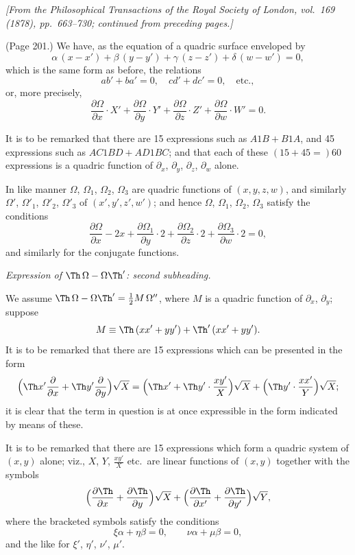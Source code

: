 \documentclass[11pt,a4paper]{book}
\begin{document}
\noindent\textit{[From the \emph{Philosophical Transactions of the Royal Society of London}, vol.~169 (1878), pp.~663--730; continued from preceding pages.]}

\medskip

\noindent (Page 201.) We have, as the equation of a quadric surface enveloped by
\[
\alpha\,(x - x') + \beta\,(y - y') + \gamma\,(z - z') + \delta\,(w - w') = 0,
\]
which is the same form as before, the relations
\[
ab' + ba' = 0, \quad cd' + dc' = 0, \quad \text{etc.},
\]
or, more precisely,
\[
\frac{\partial\Omega}{\partial x} \cdot X' + \frac{\partial\Omega}{\partial y} \cdot Y' + \frac{\partial\Omega}{\partial z} \cdot Z' + \frac{\partial\Omega}{\partial w} \cdot W' = 0.
\]

It is to be remarked that there are 15 expressions such as $A1B + B1A$, and 45 expressions such as $AC1BD + AD1BC$; and that each of these $(15 + 45 = ) 60$ expressions is a quadric function of $\partial_x$, $\partial_y$, $\partial_z$, $\partial_w$ alone.

In like manner $\Omega$, $\Omega_1$, $\Omega_2$, $\Omega_3$ are quadric functions of $(x, y, z, w)$, and similarly $\Omega'$, $\Omega'_1$, $\Omega'_2$, $\Omega'_3$ of $(x', y', z', w')$; and hence $\Omega$, $\Omega_1$, $\Omega_2$, $\Omega_3$ satisfy the conditions
\[
\frac{\partial\Omega}{\partial x} - 2x + \frac{\partial\Omega_1}{\partial y} \cdot 2 + \frac{\partial\Omega_2}{\partial z} \cdot 2 + \frac{\partial\Omega_3}{\partial w} \cdot 2 = 0,
\]
and similarly for the conjugate functions.

\medskip

\noindent \textit{Expression of $\Th\,\Omega - \Omega\Th'$: second subheading.}

We assume $\Th\,\Omega - \Omega\Th' = \tfrac{1}{2}M\,\Omega''$, where $M$ is a quadric function of $\partial_x$, $\partial_y$; suppose
\[
M \equiv \Th\,(x x' + y y') + \Th'\,(x x' + y y').
\]
It is to be remarked that there are 15 expressions which can be presented in the form
\[
\Big(\Th x' \frac{\partial}{\partial x} + \Th y' \frac{\partial}{\partial y}\Big) \sqrt{X} = \Big( \Th x' + \Th y' \cdot \frac{x y'}{X} \Big) \sqrt{X} + \Big(\Th y' \cdot \frac{x x'}{Y}\Big) \sqrt{X};
\]
it is clear that the term in question is at once expressible in the form indicated by means of these.

It is to be remarked that there are 15 expressions which form a quadric system of $(x, y)$ alone; viz., $X$, $Y$, $\frac{x y'}{X}$ etc.\ are linear functions of $(x, y)$ together with the symbols
\[
\Big(\frac{\partial\Th}{\partial x} + \frac{\partial\Th}{\partial y}\Big) \sqrt{X} + \Big(\frac{\partial\Th}{\partial x'} + \frac{\partial\Th}{\partial y'}\Big) \sqrt{Y},
\]
where the bracketed symbols satisfy the conditions
\[
\xi \alpha + \eta \beta = 0, \qquad \nu \alpha + \mu \beta = 0,
\]
and the like for $\xi'$, $\eta'$, $\nu'$, $\mu'$.
\end{document}
